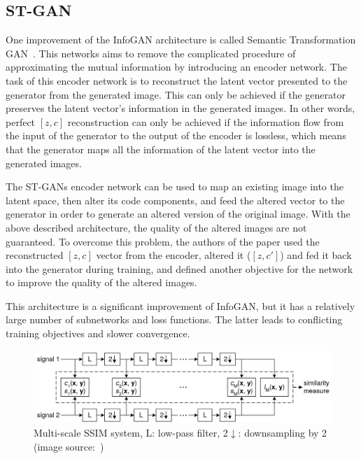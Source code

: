 \documentclass{egpubl}
\begin{document}
\subsection{ST-GAN}
\label{sec:propDet}

One improvement of the InfoGAN architecture is called Semantic Transformation GAN~\cite{liu2019stgan}. This networks aims to remove the complicated procedure of approximating the mutual information by introducing an encoder network. The task of this encoder network is to reconstruct the latent vector presented to the generator from the generated image. %
This can only be achieved if the generator preserves the latent vector's information in the generated images. In other words, perfect $[z,c]$ reconstruction can only be achieved if the information flow from the input of the generator to the output of the encoder is lossless, which %
means that the generator maps all the information of the latent vector into the generated images.

The ST-GANs encoder network can be used %
to map an existing image into the latent space, then alter its code components, %
and feed the altered vector to the generator in order to generate an altered version of the original image. With the above described architecture, %
the quality of the altered images are not guaranteed. To overcome this problem, %
the authors of the paper used the reconstructed $[z,c]$ vector from the encoder, altered it ($[z,c']$) and fed it %
back into the generator during training, and defined another objective for the network to improve the quality of the altered images.

This architecture is a significant improvement of InfoGAN, but it has a relatively large number of subnetworks and loss functions. %
The latter leads to conflicting training objectives and slower convergence.

\begin{figure}[!htb]
	\centering
	\includegraphics[width=\textwidth]{pic/MS-SSIM}
	\caption{Multi-scale SSIM system, L: low-pass filter, 2$\downarrow$: downsampling by 2 (image source:~\cite{1292216})}
	\label{fig:ms_ssim}
\end{figure}
\end{document}
